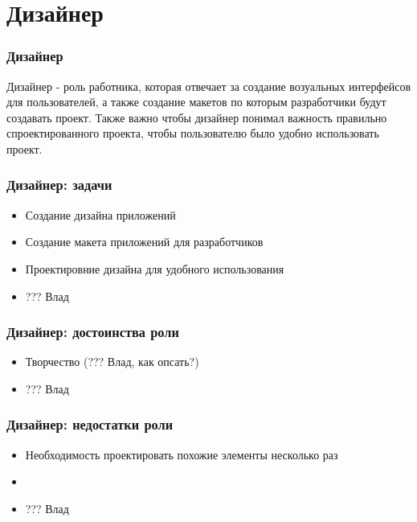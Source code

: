 \documentclass{../industrial-development}
\begin{document}
\section{Дизайнер }

\begin{frame} \frametitle{Дизайнер}
	\begin{block}{}
		\alert {Дизайнер} - роль работника, которая отвечает за создание возуальных интерфейсов для пользователей, а также создание макетов по которым разработчики будут создавать проект. Также важно чтобы дизайнер понимал важность правильно спроектированного проекта, чтобы пользователю было удобно использовать проект.
	\end{block}
	
\end{frame}

\begin{frame} \frametitle{Дизайнер: задачи}
	\begin{block}{}
		\begin{itemize}
			\item Создание дизайна приложений
			\item Создание макета приложений для разработчиков
			\item Проектировние дизайна для удобного использования
			\item  ??? Влад
		\end{itemize}
	\end{block}
\end{frame}

\begin{frame} \frametitle{Дизайнер: достоинства роли}
	\begin{block}{}
		\begin{itemize}
			\item Творчество (??? Влад, как опсать?)
			\item  ??? Влад
		\end{itemize}
	\end{block}
\end{frame}

\begin{frame} \frametitle{Дизайнер: недостатки роли}
	\begin{block}{}
		\begin{itemize}
			\item Необходимость проектировать похожие элементы несколько раз
			\item 
			\item  ??? Влад
		\end{itemize}
	\end{block}
\end{frame}
\end{document}
